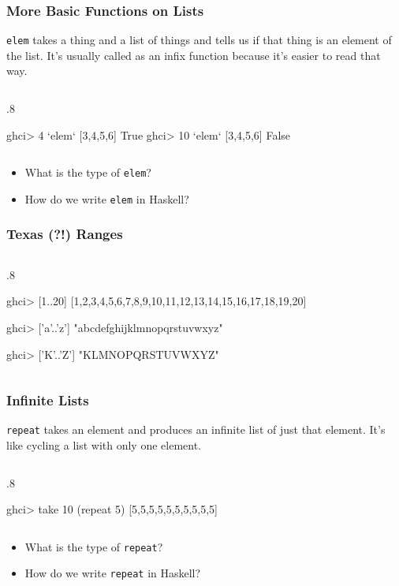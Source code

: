 \documentclass{beamer}
\newenvironment{codeblock}[1][.8]{%
\begin{columns}
\begin{column}{#1\linewidth}
\begin{exampleblock}{}}{%
\end{exampleblock}
\end{column}
\end{columns}}
\begin{document}
\begin{frame}[fragile]
\frametitle{More Basic Functions on Lists}

\verb+elem+ takes a thing and a list of things and tells us if that thing is an element of the list. It's usually called as an infix function because it's easier to read that way.

\begin{codeblock}
\begin{hcode}
ghci> 4 `elem` [3,4,5,6]  
True  
ghci> 10 `elem` [3,4,5,6]  
False 
\end{hcode}
\end{codeblock}

\begin{itemize}

\item What is the type of \verb+elem+?

\item How do we write \verb+elem+ in Haskell?

\end{itemize}

\end{frame}


\begin{frame}[fragile]
\frametitle{Texas (?!) Ranges}


\begin{codeblock}
\begin{hcode}
ghci> [1..20]  
[1,2,3,4,5,6,7,8,9,10,11,12,13,14,15,16,17,18,19,20]  

ghci> ['a'..'z']  
"abcdefghijklmnopqrstuvwxyz"  

ghci> ['K'..'Z']  
"KLMNOPQRSTUVWXYZ"  
\end{hcode}
\end{codeblock}


\end{frame}


\begin{frame}[fragile]
\frametitle{Infinite Lists}

\verb+repeat+ takes an element and produces an infinite list of just that element. It's like cycling a list with only one element.

\begin{codeblock}
\begin{hcode}
ghci> take 10 (repeat 5)  
[5,5,5,5,5,5,5,5,5,5] 
\end{hcode}
\end{codeblock}

\begin{itemize}

\item What is the type of \verb+repeat+?

\item How do we write \verb+repeat+ in Haskell?

\end{itemize}

\end{frame}
\end{document}
